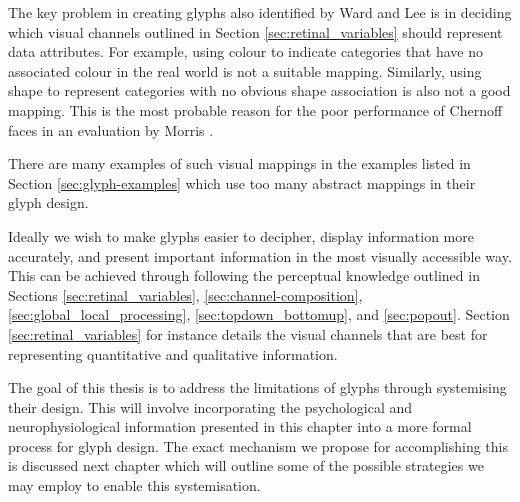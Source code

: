 The key problem in creating glyphs also identified by Ward \cite{ward02} and Lee \etal \cite{Lee03anempirical} is in deciding which visual channels outlined in Section \ref{sec:retinal_variables} should represent data attributes. 
For example, using colour to indicate categories that have no associated colour in the real world is not a suitable mapping.
Similarly, using shape to represent categories with no obvious shape association is also not a good mapping.
This is the most probable reason for the poor performance of Chernoff faces in an evaluation by Morris \etal \cite{morris2000experimental}.

There are many examples of such visual mappings in the examples listed in Section \ref{sec:glyph-examples} which use too many abstract mappings in their glyph design. 

Ideally we wish to make glyphs easier to decipher, display information more accurately, and present important information in the most visually accessible way. 
This can be achieved through following the perceptual knowledge outlined in Sections \ref{sec:retinal_variables}, \ref{sec:channel-composition}, \ref{sec:global_local_processing}, \ref{sec:topdown_bottomup}, and \ref{sec:popout}. 
Section \ref{sec:retinal_variables} for instance details the visual channels that are best for representing quantitative and qualitative information. 

The goal of this thesis is to address the limitations of glyphs through systemising their design.
This will involve incorporating the psychological and neurophysiological information presented in this chapter into a more formal process for glyph design. 
The exact mechanism we propose for accomplishing this is discussed next chapter which will outline some of the possible strategies we may employ to enable this systemisation. 
